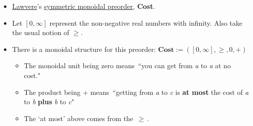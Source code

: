 \begin{itemize}
    \item \href{doc/1 math/Seven Sketches in Compositionality/Chapter 2: Resource theories/3 Enrichment/3 Lawvere metric spaces/2 Lawvere metric space}{Lawvere}'s \href{doc/1 math/Seven Sketches in Compositionality/Chapter 2: Resource theories/2 Symmetric monoidal preorders/1 Definition and first examples/1 Symmetric monoidal structure on a preorder}{symmetric monoidal preorder}, \textbf{Cost}.
    \item Let $[0,\infty]$ represent the non-negative real numbers with infinity. Also take the usual notion of $\geq$.
    \item There is a monoidal structure for this preorder: $\mathbf{Cost}:=([0,\infty],\geq,0,+)$
          \begin{itemize}
            \item The monoidal unit being zero means \,``you can get from \emph{a} to \emph{a} at no cost."\,
            \item The product being + means \,``getting from \emph{a} to \emph{c} is \textbf{at most} the cost of \emph{a} to \emph{b} \textbf{plus} \emph{b} to \emph{c}"\,
            \item The `at most' above comes from the \,$\geq$\,.   \end{itemize}
  \end{itemize}
